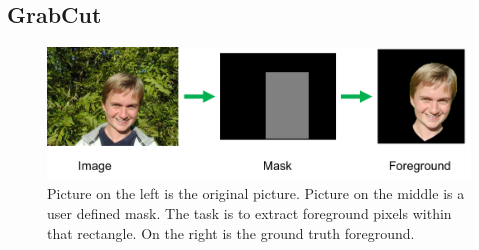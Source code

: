



\subsection{GrabCut}
\label{sec:grabcut}

\begin{figure}[b]
  \centering
  \includegraphics[width=1\linewidth]{RelatedWorks/figures/grabcut_task.png}
  \caption{\label{fig:grabcut_example} Picture on the left is
    the original picture. Picture
    on the middle is a user defined mask. The task is to extract
    foreground pixels within that rectangle. On the right is the
    ground truth foreground.}
\end{figure}


